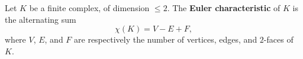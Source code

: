 Let $K$ be a finite complex, of dimension $\leqslant 2$. The \textbf{Euler characteristic} of $K$ is the alternating sum
$$
\chi(K) = V - E + F,
$$
where $V$, $E$, and $F$ are respectively the number of vertices, edges, and $2$-faces of $K$.
